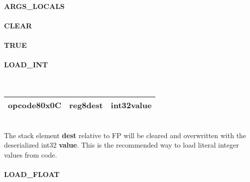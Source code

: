 \documentclass[12pt,a4paper]{article}
\begin{document}
\vspace{2em}\begin{minipage}{\textwidth}
\paragraph{ARGS\_LOCALS}
\end{minipage}

\vspace{2em}\begin{minipage}{\textwidth}
\paragraph{CLEAR}
\end{minipage}

\vspace{2em}\begin{minipage}{\textwidth}
\paragraph{TRUE}
\end{minipage}

\vspace{2em}\begin{minipage}{\textwidth}
\paragraph{LOAD\_INT}
~\vspace{1em}\\\begin{tabular}{|p{2cm}|p{2cm}|p{8cm}|}
\hline
opcode8\newline\textbf{0x0C} & reg8\newline\textbf{dest} & int32\newline\textbf{value} \\
\hline
\end{tabular}\vspace{1em}\\
The stack element \textbf{dest} relative to FP will be cleared and overwritten with the deserialized int32 \textbf{value}. This is the recommended way to load literal integer values from code.
\end{minipage}

\vspace{2em}\begin{minipage}{\textwidth}
\paragraph{LOAD\_FLOAT}
\end{minipage}
\end{document}
